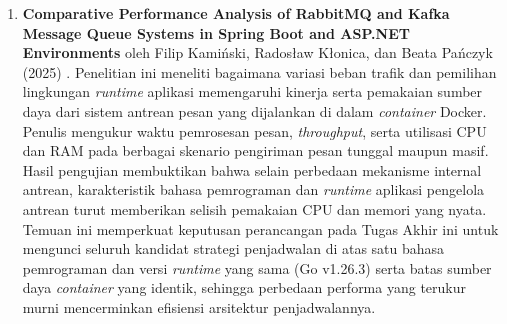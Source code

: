 \begin{enumerate}[noitemsep]
	\item \textbf{Comparative Performance Analysis of RabbitMQ and Kafka Message Queue Systems in Spring Boot and ASP.NET Environments} oleh Filip Kami{\'n}ski, Rados{\l}aw K{\l}onica, dan Beata Pa{\'n}czyk (2025) \cite{kaminski2025comparative}. Penelitian ini meneliti bagaimana variasi beban trafik dan pemilihan lingkungan \textit{runtime} aplikasi memengaruhi kinerja serta pemakaian sumber daya dari sistem antrean pesan yang dijalankan di dalam \textit{container} Docker. Penulis mengukur waktu pemrosesan pesan, \textit{throughput}, serta utilisasi CPU dan RAM pada berbagai skenario pengiriman pesan tunggal maupun masif. Hasil pengujian membuktikan bahwa selain perbedaan mekanisme internal antrean, karakteristik bahasa pemrograman dan \textit{runtime} aplikasi pengelola antrean turut memberikan selisih pemakaian CPU dan memori yang nyata. Temuan ini memperkuat keputusan perancangan pada Tugas Akhir ini untuk mengunci seluruh kandidat strategi penjadwalan di atas satu bahasa pemrograman dan versi \textit{runtime} yang sama (Go v1.26.3) serta batas sumber daya \textit{container} yang identik, sehingga perbedaan performa yang terukur murni mencerminkan efisiensi arsitektur penjadwalannya.
\end{enumerate}

